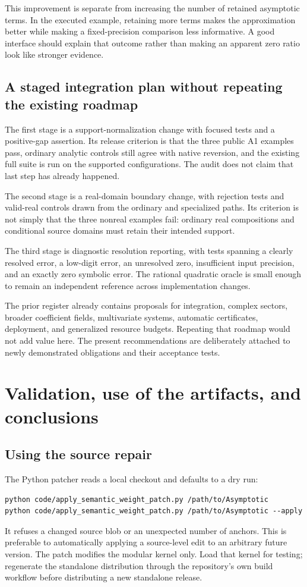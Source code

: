 \documentclass[11pt,letterpaper]{article}
\begin{document}
This improvement is separate from increasing the number of retained asymptotic terms. In the executed example, retaining more terms makes the approximation better while making a fixed-precision comparison less informative. A good interface should explain that outcome rather than making an apparent zero ratio look like stronger evidence.

\subsection{A staged integration plan without repeating the existing roadmap}
The first stage is a support-normalization change with focused tests and a positive-gap assertion. Its release criterion is that the three public A1 examples pass, ordinary analytic controls still agree with native reversion, and the existing full suite is run on the supported configurations. The audit does not claim that last step has already happened.

The second stage is a real-domain boundary change, with rejection tests and valid-real controls drawn from the ordinary and specialized paths. Its criterion is not simply that the three nonreal examples fail: ordinary real compositions and conditional source domains must retain their intended support.

The third stage is diagnostic resolution reporting, with tests spanning a clearly resolved error, a low-digit error, an unresolved zero, insufficient input precision, and an exactly zero symbolic error. The rational quadratic oracle is small enough to remain an independent reference across implementation changes.

The prior register already contains proposals for integration, complex sectors, broader coefficient fields, multivariate systems, automatic certificates, deployment, and generalized resource budgets. Repeating that roadmap would not add value here. The present recommendations are deliberately attached to newly demonstrated obligations and their acceptance tests.\cite{status}

\section{Validation, use of the artifacts, and conclusions}
\subsection{Using the source repair}
The Python patcher reads a local checkout and defaults to a dry run:
\begin{lstlisting}
python code/apply_semantic_weight_patch.py /path/to/Asymptotic
python code/apply_semantic_weight_patch.py /path/to/Asymptotic --apply
\end{lstlisting}
It refuses a changed source blob or an unexpected number of anchors. This is preferable to automatically applying a source-level edit to an arbitrary future version. The patch modifies the modular kernel only. Load that kernel for testing; regenerate the standalone distribution through the repository's own build workflow before distributing a new standalone release.
\end{document}
